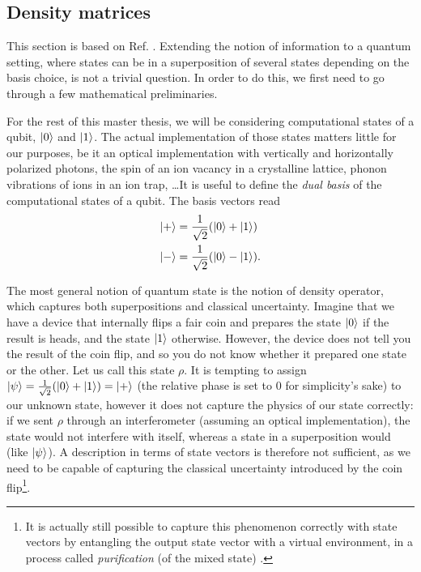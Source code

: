 


\subsection{Density matrices} \label{sec:density_matrices}

This section is based on Ref. \cite[pp. 98--108]{nielsen_quantum_2010}. Extending the notion of information to a quantum setting, where states can be in a superposition of several states depending on the basis choice, is not a trivial question. In order to do this, we first need to go through a few mathematical preliminaries. 

For the rest of this master thesis, we will be considering computational states of a qubit, $\ket{0}$ and $\ket{1}$. The actual implementation of those states matters little for our purposes, be it an optical implementation with vertically and horizontally polarized photons, the spin of an ion vacancy in a crystalline lattice, phonon vibrations of ions in an ion trap, \dots It is useful to define the \textit{dual basis} of the computational states of a qubit. The basis vectors read
\begin{align}
    \ket{+} &= \frac{1}{\sqrt{2}} (\ket{0} + \ket{1})\\
    \ket{-} &= \frac{1}{\sqrt{2}} (\ket{0} - \ket{1}).
\end{align}

The most general notion of quantum state is the notion of density operator, which captures both superpositions and classical uncertainty. Imagine that we have a device that internally flips a fair coin and prepares the state $\ket{0}$ if the result is heads, and the state $\ket{1}$ otherwise. However, the device does not tell you the result of the coin flip, and so you do not know whether it prepared one state or the other. Let us call this state $\rho$. It is tempting to assign $\ket{\psi} = \frac{1}{\sqrt{2}}(\ket{0} + \ket{1}) = \ket{+}$ (the relative phase is set to 0 for simplicity's sake) to our unknown state, however it does not capture the physics of our state correctly: if we sent $\rho$ through an interferometer (assuming an optical implementation), the state would not interfere with itself, whereas a state in a superposition would (like $\ket{\psi}$). A description in terms of state vectors is therefore not sufficient, as we need to be capable of capturing the classical uncertainty introduced by the coin flip\footnote{It is actually still possible to capture this phenomenon correctly with state vectors by entangling the output state vector with a virtual environment, in a process called \textit{purification} (of the mixed state) \cite[p. 110]{nielsen_quantum_2010}.}.

